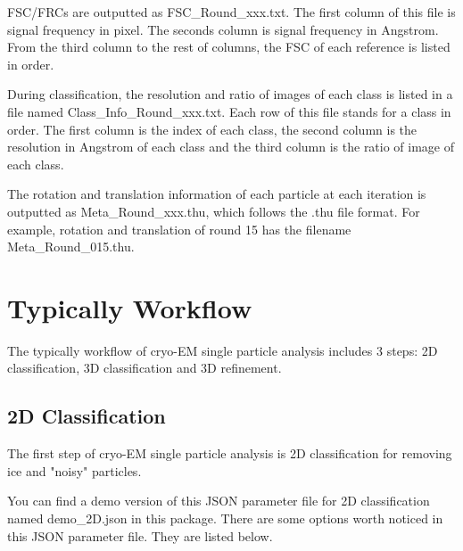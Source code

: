 \documentclass{article}
\begin{document}
        FSC/FRCs are outputted as \textsf{FSC\_Round\_xxx.txt}. The first column of this file is signal frequency in pixel. The seconds column is signal frequency in Angstrom. From the third column to the rest of columns, the FSC of each reference is listed in order.
        
        During classification, the resolution and ratio of images of each class is listed in a file named \textsf{Class\_Info\_Round\_xxx.txt}. Each row of this file stands for a class in order. The first column is the index of each class, the second column is the resolution in Angstrom of each class and the third column is the ratio of image of each class.

        The rotation and translation information of each particle at each iteration is outputted as \textsf{Meta\_Round\_xxx.thu}, which follows the \textsf{.thu} file format. For example, rotation and translation of round 15 has the filename \textsf{Meta\_Round\_015.thu}.
        
    \section{Typically Workflow}
    
        The typically workflow of cryo-EM single particle analysis includes 3 steps: 2D classification, 3D classification and 3D refinement. 
        
        \subsection{2D Classification}
        
        The first step of cryo-EM single particle analysis is 2D classification for removing ice and "noisy" particles.
        
        You can find a demo version of this JSON parameter file for 2D classification named \textsf{demo\_2D.json} in this package. There are some options worth noticed in this JSON parameter file. They are listed below.
        
\end{document}

